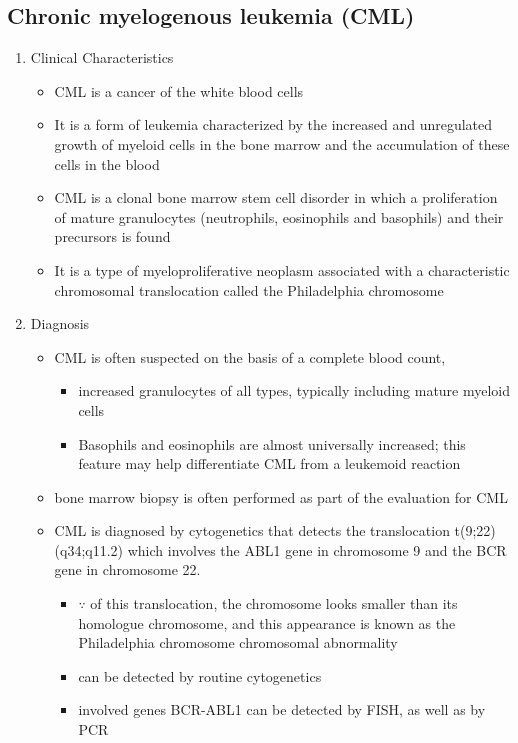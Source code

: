 \documentclass[12pt]{scrartcl}
\begin{document}
\subsection{Chronic myelogenous leukemia (CML)}
\label{sec:orgd881bc1}
\begin{enumerate}
\item Clinical Characteristics
\label{sec:org0e890c4}
\begin{itemize}
\item CML is a cancer of the white blood cells
\item It is a form of leukemia characterized by the increased and
unregulated growth of myeloid cells in the bone marrow and the
accumulation of these cells in the blood
\item CML is a clonal bone marrow stem cell disorder in which a
proliferation of mature granulocytes (neutrophils, eosinophils and
basophils) and their precursors is found
\item It is a type of myeloproliferative neoplasm associated with a
characteristic chromosomal translocation called the Philadelphia
chromosome
\end{itemize}

\item Diagnosis
\label{sec:org978c777}
\begin{itemize}
\item CML is often suspected on the basis of a complete blood count,
\begin{itemize}
\item increased granulocytes of all types, typically including mature myeloid cells
\item Basophils and eosinophils are almost universally increased; this feature may help differentiate CML from a leukemoid reaction
\end{itemize}
\item bone marrow biopsy is often performed as part of the evaluation for CML
\item CML is diagnosed by cytogenetics that detects the translocation t(9;22)(q34;q11.2) which involves the ABL1 gene in chromosome 9 and the BCR gene in chromosome 22.
\begin{itemize}
\item \(\because\) of this translocation, the chromosome looks smaller than
its homologue chromosome, and this appearance is known as the
Philadelphia chromosome chromosomal abnormality
\item can be detected by routine cytogenetics
\item involved genes BCR-ABL1 can be detected by FISH, as well as by
PCR
\end{itemize}
\end{itemize}


\end{enumerate}
\end{document}
